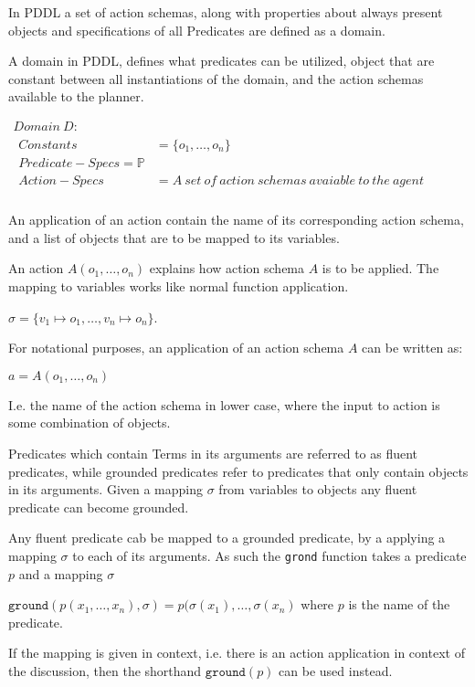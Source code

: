 \documentclass[../Master.tex]{subfiles}
\begin{document}
In PDDL a set of action schemas, along with properties about always present objects and specifications of all Predicates are defined as a domain.

\begin{definition} A domain in PDDL, defines what predicates can be utilized, object that are constant between all instantiations of the domain, and the action schemas available to the planner.
	
$
\begin{array}{ll}
Domain ~ D: & \\

\begin{array}{ll}
Constants & = \{o_1,\dots,o_n\}			 \\  
Predicate-Specs = \mathbb{P} \\
Action-Specs & = A~set~of~action~schemas~avaiable~to~the~agent \\
\end{array}
\end{array}$
\end{definition}


	

An application of an action contain the name of its corresponding action schema, and a list of objects that are to be mapped to its variables.
\begin{definition} 
	An action $A(o_1,\dots,o_n)$ explains how action schema $A$ is to be applied. The mapping to variables works like normal function application. 
	
	$\sigma = \{ v_1 \mapsto o_1,\dots,v_n \mapsto o_n \}$.
	
	For notational purposes, an application of an action schema $A$ can be written as:
	
	$a = A(o_1,\dots,o_n)$ 
	
	I.e. the name of the action schema in lower case, where the input to action is some combination of objects.
	
	
	
\end{definition}


Predicates which contain Terms in its arguments are referred to as fluent predicates, while grounded predicates refer to predicates that only contain objects in its arguments. Given a mapping $\sigma$ from variables to objects any fluent predicate can become grounded.
\begin{definition} 
	Any fluent predicate cab be mapped to a grounded predicate, by a applying a mapping $\sigma$ to each of its arguments. As such the \texttt{grond} function takes a predicate $p$ and a mapping $\sigma$
	
		$\texttt{ground}(p(x_1,\dots,x_n),\sigma) = p(\sigma(x_1),\dots,\sigma(x_n)$ where $p$ is the name of the predicate.
		
	If the mapping is given in context, i.e. there is an action application in context of the discussion, then the shorthand $\texttt{ground}(p)$ can be used instead.
\end{definition}
\end{document}
